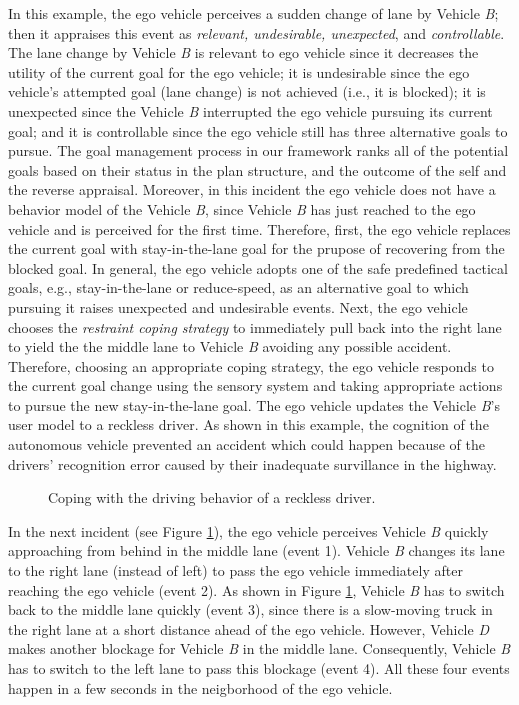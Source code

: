 \documentclass[journal, 11pt]{IEEEtran}
\begin{document}
In this example, the ego vehicle perceives a sudden change of lane by Vehicle
\textit{B}; then it appraises this event as \textit{relevant, undesirable,
unexpected}, and \textit{controllable}. The lane change by Vehicle \textit{B} is
relevant to ego vehicle since it decreases the utility of the current goal for
the ego vehicle; it is undesirable since the ego vehicle's attempted goal (lane
change) is not achieved (i.e., it is blocked); it is unexpected since the
Vehicle \textit{B} interrupted the ego vehicle pursuing its current goal; and it
is controllable since the ego vehicle still has three alternative goals to
pursue. The goal management process in our framework ranks all of the potential
goals based on their status in the plan structure, and the outcome of the self
and the reverse appraisal. Moreover, in this incident the ego vehicle does not
have a behavior model of the Vehicle \textit{B}, since Vehicle \textit{B} has
just reached to the ego vehicle and is perceived for the first time. Therefore,
first, the ego vehicle replaces the current goal with stay-in-the-lane goal for
the prupose of recovering from the blocked goal. In general, the ego vehicle
adopts one of the safe predefined tactical goals, e.g., stay-in-the-lane or
reduce-speed, as an alternative goal to which pursuing it raises unexpected and
undesirable events. Next, the ego vehicle chooses the \textit{restraint coping
strategy} to immediately pull back into the right lane to yield the the middle
lane to Vehicle \textit{B} avoiding any possible accident. Therefore, choosing
an appropriate coping strategy, the ego vehicle responds to the current goal
change using the sensory system and taking appropriate actions to pursue the new
stay-in-the-lane goal. The ego vehicle updates the Vehicle \textit{B}'s user
model to a reckless driver. As shown in this example, the cognition of the
autonomous vehicle prevented an accident which could happen because of the
drivers' recognition error caused by their inadequate survillance in the
highway.

\begin{figure}[!t]
  \centerline{}
  \vspace*{-2mm}
  \caption{Coping with the driving behavior of a reckless driver.}
  \label{fig:example2}
  \vspace*{-5mm}
\end{figure}

In the next incident (see Figure \ref{fig:example2}), the ego vehicle perceives
Vehicle \textit{B} quickly approaching from behind in the middle lane (event 1).
Vehicle \textit{B} changes its lane to the right lane (instead of left) to pass
the ego vehicle immediately after reaching the ego vehicle (event 2). As
shown in Figure \ref{fig:example2}, Vehicle \textit{B} has to switch back to the
middle lane quickly (event 3), since there is a slow-moving truck in the right
lane at a short distance ahead of the ego vehicle. However, Vehicle \textit{D}
makes another blockage for Vehicle \textit{B} in the middle lane. Consequently,
Vehicle \textit{B} has to switch to the left lane to pass this blockage (event
4). All these four events happen in a few seconds in the neigborhood of the ego
vehicle.
\end{document}
